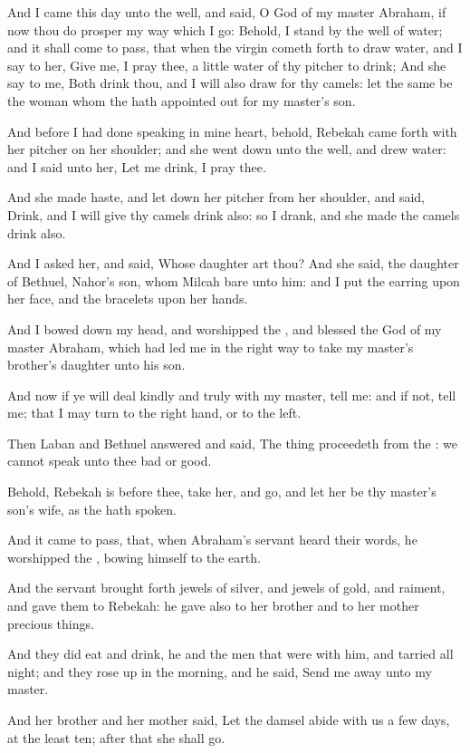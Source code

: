\verse And I came this day unto the well, and said, O \LORD God of my
master Abraham, if now thou do prosper my way which I go: \verse
Behold, I stand by the well of water; and it shall come to pass, that
when the virgin cometh forth to draw water, and I say to her, Give me,
I pray thee, a little water of thy pitcher to drink; \verse And she say
to me, Both drink thou, and I will also draw for thy camels: let the
same be the woman whom the \LORD hath appointed out for my master's
son.

\verse And before I had done speaking in mine heart, behold, Rebekah
came forth with her pitcher on her shoulder; and she went down unto
the well, and drew water: and I said unto her, Let me drink, I pray
thee.

\verse And she made haste, and let down her pitcher from her shoulder,
and said, Drink, and I will give thy camels drink also: so I drank,
and she made the camels drink also.

\verse And I asked her, and said, Whose daughter art thou? And she
said, the daughter of Bethuel, Nahor's son, whom Milcah bare unto him:
and I put the earring upon her face, and the bracelets upon her hands.

\verse And I bowed down my head, and worshipped the \LORD, and blessed
the \LORD God of my master Abraham, which had led me in the right way
to take my master's brother's daughter unto his son.

\verse And now if ye will deal kindly and truly with my master, tell
me: and if not, tell me; that I may turn to the right hand, or to the
left.

\verse Then Laban and Bethuel answered and said, The thing proceedeth
from the \LORD: we cannot speak unto thee bad or good.

\verse Behold, Rebekah is before thee, take her, and go, and let her be
thy master's son's wife, as the \LORD hath spoken.

\verse And it came to pass, that, when Abraham's servant heard their
words, he worshipped the \LORD, bowing himself to the earth.

\verse And the servant brought forth jewels of silver, and jewels of
gold, and raiment, and gave them to Rebekah: he gave also to her
brother and to her mother precious things.

\verse And they did eat and drink, he and the men that were with him,
and tarried all night; and they rose up in the morning, and he said,
Send me away unto my master.

\verse And her brother and her mother said, Let the damsel abide with
us a few days, at the least ten; after that she shall go.

